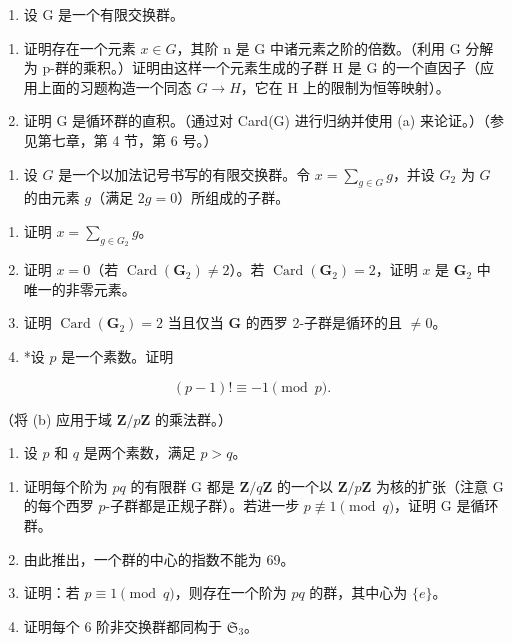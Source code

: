\begin{enumerate}
\def\labelenumi{\arabic{enumi}。}
\setcounter{enumi}{18}
\tightlist
\item
  设 G 是一个有限交换群。
\end{enumerate}

\begin{enumerate}
\def\labelenumi{(\alph{enumi})}
\item
  证明存在一个元素 \(x \in G\)，其阶 n 是 G 中诸元素之阶的倍数。（利用 G 分解为 p-群的乘积。）证明由这样一个元素生成的子群 H 是 G 的一个直因子（应用上面的习题构造一个同态 \(G \to H\)，它在 H 上的限制为恒等映射）。
\item
  证明 G 是循环群的直积。（通过对 Card(G) 进行归纳并使用 (a) 来论证。）（参见第七章，第 4 节，第 6 号。）
\end{enumerate}

\begin{enumerate}
\def\labelenumi{\arabic{enumi}。}
\setcounter{enumi}{19}
\tightlist
\item
  设 \(G\) 是一个以加法记号书写的有限交换群。令 \(x = \sum_{g \in G} g\)，并设 \(G_2\) 为 \(G\) 的由元素 \(g\)（满足 \(2g = 0\)）所组成的子群。
\end{enumerate}

\begin{enumerate}
\def\labelenumi{(\alph{enumi})}
\item
  证明 \(x = \sum_{g \in G_2} g\)。
\item
  证明 \(x = 0\)（若 \(\operatorname{Card}(\mathbf{G}_2) \neq 2\)）。若 \(\operatorname{Card}(\mathbf{G}_2) = 2\)，证明 \(x\) 是 \(\mathbf{G}_2\) 中唯一的非零元素。
\item
  证明 \(\operatorname{Card}(\mathbf{G}_2) = 2\) 当且仅当 \(\mathbf{G}\) 的西罗 2-子群是循环的且 \(\neq 0\)。
\item
  *设 \(p\) 是一个素数。证明
\end{enumerate}

\[
(p - 1)! \equiv - 1 \pmod {p}.
\]

（将 (b) 应用于域 \(\mathbf{Z} / p\mathbf{Z}\) 的乘法群。）

\begin{enumerate}
\def\labelenumi{\arabic{enumi}。}
\setcounter{enumi}{20}
\tightlist
\item
  设 \(p\) 和 \(q\) 是两个素数，满足 \(p > q\)。
\end{enumerate}

\begin{enumerate}
\def\labelenumi{(\alph{enumi})}
\item
  证明每个阶为 \(pq\) 的有限群 G 都是 \(\mathbf{Z}/q\mathbf{Z}\) 的一个以 \(\mathbf{Z}/p\mathbf{Z}\) 为核的扩张（注意 G 的每个西罗 \(p\)-子群都是正规子群）。若进一步 \(p \not\equiv 1 \pmod{q}\)，证明 G 是循环群。
\item
  由此推出，一个群的中心的指数不能为 69。
\item
  证明：若 \(p \equiv 1 \pmod{q}\)，则存在一个阶为 \(pq\) 的群，其中心为 \(\{e\}\)。
\item
  证明每个 6 阶非交换群都同构于 \(\mathfrak{S}_3\)。
\end{enumerate}

